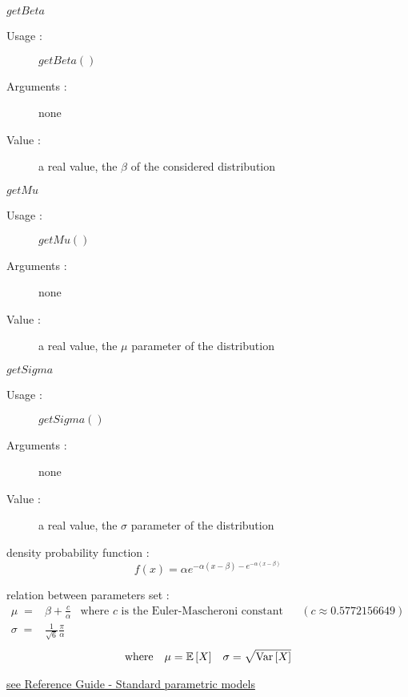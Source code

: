 \begin{description}
\begin{description}
  \item $getBeta$
    \begin{description}
    \item[Usage :] $getBeta()$
    \item[Arguments :] none
    \item[Value :]  a real value, the  $\beta$ of the considered distribution
    \end{description}
    \bigskip
  \item $getMu$
    \begin{description}
    \item[Usage :] $getMu()$
    \item[Arguments :] none
    \item[Value :]  a real value,  the $\mu$ parameter of the  distribution
    \end{description}
    \bigskip
  \item $getSigma$
    \begin{description}
    \item[Usage :] $getSigma()$
    \item[Arguments :] none
    \item[Value :]  a real value,  the $\sigma$ parameter of the  distribution
    \end{description}
    \bigskip
  \end{description}

\item[Details :]  \rule{0pt}{1em}
  \begin{description}
  \item density probability function :
    $$
    f(x) = \alpha e^{-\alpha(x-\beta)-e^{-\alpha(x-\beta)}}
    $$
  \item relation between parameters set :
    \begin{align*}
      \mu \;            =       &   \beta + \frac{c}{\alpha}
      & \mbox{where $c$ is the Euler-Mascheroni constant}
      && (c \approx 0.5772156649)
      \\
      \sigma \;  =      &       \frac{1}{\sqrt{6}}\frac{\pi}{\alpha}
    \end{align*}
    \begin{align*}
      \mbox{where}
      &&
      \mu = {\mathbb E}\left[ X \right]
      &&
      \sigma = \sqrt{{\rm Var}\left[ X \right] }
    \end{align*}
  \end{description}

\item[Links :]  \rule{0pt}{1em}
  \href{OpenTURNS_ReferenceGuide.pdf}{see Reference Guide - Standard parametric models}
\end{description}

